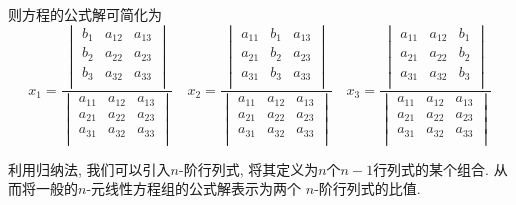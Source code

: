 \begin{frame}
则方程的公式解可简化为
\begin{equation*}
x_1 = \frac{
\begin{vmatrix}b_{1}&a_{12}&a_{13}\\b_{2}&a_{22}&a_{23}\\b_{3}&a_{32}&a_{33}\\\end{vmatrix}
}{
\begin{vmatrix}a_{11}&a_{12}&a_{13}\\a_{21}&a_{22}&a_{23}\\a_{31}&a_{32}&a_{33}\\\end{vmatrix}}
\quad x_2 = \frac{
\begin{vmatrix}a_{11}&b_{1}&a_{13}\\a_{21}&b_{2}&a_{23}\\a_{31}&b_{3}&a_{33}\\\end{vmatrix}
}{
\begin{vmatrix}a_{11}&a_{12}&a_{13}\\a_{21}&a_{22}&a_{23}\\a_{31}&a_{32}&a_{33}\\\end{vmatrix}}
\quad x_3 = \frac{
\begin{vmatrix}a_{11}&a_{12}&b_{1}\\a_{21}&a_{22}&b_{2}\\a_{31}&a_{32}&b_{3}\\\end{vmatrix}
}{
\begin{vmatrix}a_{11}&a_{12}&a_{13}\\a_{21}&a_{22}&a_{23}\\a_{31}&a_{32}&a_{33}\\\end{vmatrix}}
\end{equation*}
\pp
\bigskip

利用归纳法, 我们可以引入$n$-阶行列式, 将其定义为$n$个$n-1$行列式的某个组合. 从而将一般的$n$-元线性方程组的公式解表示为两个 $n$-阶行列式的比值.
\end{frame}

